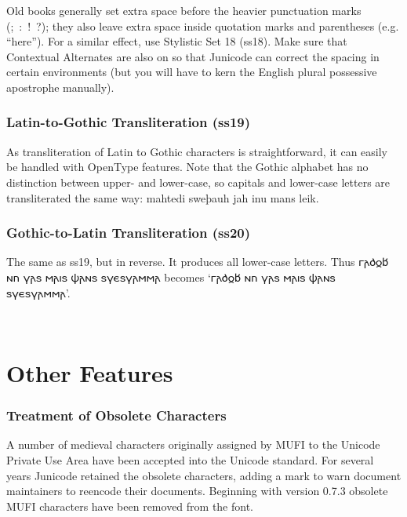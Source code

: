\documentclass[12pt,a4paper,openany]{book}
\begin{document}
{Old books generally set
extra space before the heavier punctuation marks (; : ! ?);
they also leave extra space inside quotation marks and
parentheses (e.g. “here”). For a similar effect, use Stylistic Set 18 (ss18). Make sure
that Contextual Alternates are also on so that Junicode can correct
the spacing in certain environments (but you will have to kern the English plural
possessive apostrophe manually).}

\subsection*{Latin-to-Gothic Transliteration (ss19)}

As transliteration of Latin to Gothic characters is straightforward,
it can easily be handled with OpenType features. Note that the Gothic
alphabet has no distinction between upper- and lower-case, so capitals
and lower-case letters are transliterated the same way:
{ mahtedi sweþauh jah inu mans leik}.

\subsection*{Gothic-to-Latin Transliteration (ss20)}

The same as ss19, but in reverse. It produces all lower-case
letters. Thus 𐌲𐌰𐌳𐍉𐌱 𐌽𐌿 𐍅𐌰𐍃 𐌼𐌰𐌹𐍃 𐌸𐌰𐌽𐍃 𐍃𐍅𐌴𐍃𐍅𐌰𐌼𐌼𐌰
becomes ‘{𐌲𐌰𐌳𐍉𐌱 𐌽𐌿 𐍅𐌰𐍃 𐌼𐌰𐌹𐍃 𐌸𐌰𐌽𐍃 𐍃𐍅𐌴𐍃𐍅𐌰𐌼𐌼𐌰}’.

\begin{center}
\huge {\color{myRed}}
\end{center}

\chapter*{\color{myBlue}Other Features}

\subsection*{Treatment of Obsolete Characters}

A number of medieval characters originally assigned by MUFI to the
Unicode Private Use Area have been accepted into the Unicode
standard. For several years Junicode retained the obsolete
characters, adding a mark to warn document maintainers to reencode
their documents. Beginning with version 0.7.3 obsolete MUFI characters
have been removed from the font.
\end{document}
